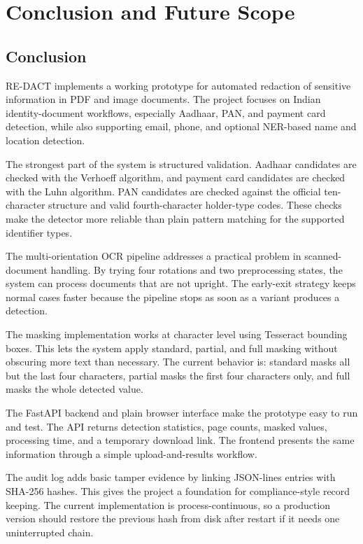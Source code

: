 \chapter{Conclusion and Future Scope}

\section{Conclusion}

RE-DACT implements a working prototype for automated redaction of sensitive information in PDF and image documents. The project focuses on Indian identity-document workflows, especially Aadhaar, PAN, and payment card detection, while also supporting email, phone, and optional NER-based name and location detection.

The strongest part of the system is structured validation. Aadhaar candidates are checked with the Verhoeff algorithm, and payment card candidates are checked with the Luhn algorithm. PAN candidates are checked against the official ten-character structure and valid fourth-character holder-type codes. These checks make the detector more reliable than plain pattern matching for the supported identifier types.

The multi-orientation OCR pipeline addresses a practical problem in scanned-document handling. By trying four rotations and two preprocessing states, the system can process documents that are not upright. The early-exit strategy keeps normal cases faster because the pipeline stops as soon as a variant produces a detection.

The masking implementation works at character level using Tesseract bounding boxes. This lets the system apply standard, partial, and full masking without obscuring more text than necessary. The current behavior is: standard masks all but the last four characters, partial masks the first four characters only, and full masks the whole detected value.

The FastAPI backend and plain browser interface make the prototype easy to run and test. The API returns detection statistics, page counts, masked values, processing time, and a temporary download link. The frontend presents the same information through a simple upload-and-results workflow.

The audit log adds basic tamper evidence by linking JSON-lines entries with SHA-256 hashes. This gives the project a foundation for compliance-style record keeping. The current implementation is process-continuous, so a production version should restore the previous hash from disk after restart if it needs one uninterrupted chain.

